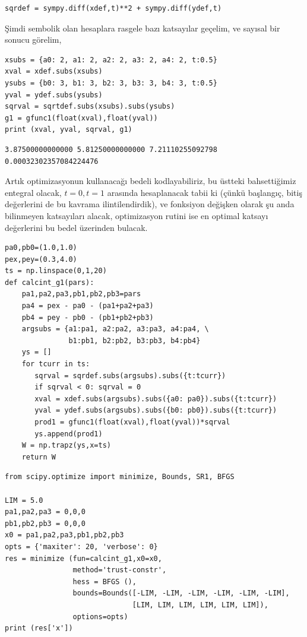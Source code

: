 \documentclass[12pt,fleqn]{article}\usepackage{../../common}
\begin{document}
\begin{verbatim}
sqrdef = sympy.diff(xdef,t)**2 + sympy.diff(ydef,t)
\end{verbatim}

Şimdi sembolik olan hesaplara rasgele bazı katsayılar geçelim, ve sayısal bir
sonucu görelim,

\begin{verbatim}
xsubs = {a0: 2, a1: 2, a2: 2, a3: 2, a4: 2, t:0.5}
xval = xdef.subs(xsubs)
ysubs = {b0: 3, b1: 3, b2: 3, b3: 3, b4: 3, t:0.5}
yval = ydef.subs(ysubs)
sqrval = sqrtdef.subs(xsubs).subs(ysubs)
g1 = gfunc1(float(xval),float(yval))
print (xval, yval, sqrval, g1)
\end{verbatim}

\begin{verbatim}
3.87500000000000 5.81250000000000 7.21110255092798 0.00032302357084224476
\end{verbatim}

Artık optimizasyonun kullanacağı bedeli kodlayabiliriz, bu üstteki bahsettiğimiz
entegral olacak, $t=0,t=1$ arasında hesaplanacak tabii ki (çünkü başlangıç,
bitiş değerlerini de bu kavrama ilintilendirdik), ve fonksiyon değişken olarak
şu anda bilinmeyen katsayıları alacak, optimizasyon rutini ise en optimal
katsayı değerlerini bu bedel üzerinden bulacak.

\begin{verbatim}
pa0,pb0=(1.0,1.0)
pex,pey=(0.3,4.0)
ts = np.linspace(0,1,20)
def calcint_g1(pars):
    pa1,pa2,pa3,pb1,pb2,pb3=pars
    pa4 = pex - pa0 - (pa1+pa2+pa3)
    pb4 = pey - pb0 - (pb1+pb2+pb3)
    argsubs = {a1:pa1, a2:pa2, a3:pa3, a4:pa4, \
               b1:pb1, b2:pb2, b3:pb3, b4:pb4}
    ys = []
    for tcurr in ts:
       sqrval = sqrdef.subs(argsubs).subs({t:tcurr})
       if sqrval < 0: sqrval = 0    
       xval = xdef.subs(argsubs).subs({a0: pa0}).subs({t:tcurr})
       yval = ydef.subs(argsubs).subs({b0: pb0}).subs({t:tcurr})
       prod1 = gfunc1(float(xval),float(yval))*sqrval
       ys.append(prod1)
    W = np.trapz(ys,x=ts)
    return W
\end{verbatim}


\begin{verbatim}
from scipy.optimize import minimize, Bounds, SR1, BFGS

LIM = 5.0
pa1,pa2,pa3 = 0,0,0
pb1,pb2,pb3 = 0,0,0
x0 = pa1,pa2,pa3,pb1,pb2,pb3
opts = {'maxiter': 20, 'verbose': 0}
res = minimize (fun=calcint_g1,x0=x0,
                method='trust-constr',
                hess = BFGS (),
                bounds=Bounds([-LIM, -LIM, -LIM, -LIM, -LIM, -LIM],
                              [LIM, LIM, LIM, LIM, LIM, LIM]),
                options=opts)
print (res['x'])
\end{verbatim}
\end{document}
